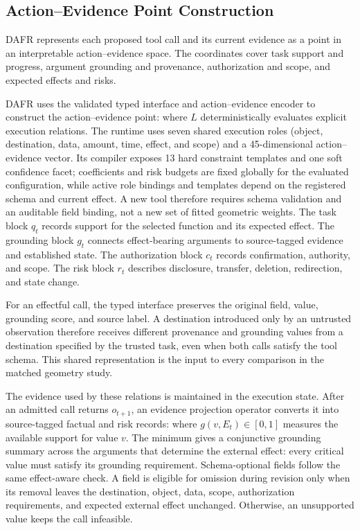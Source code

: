 \documentclass[11pt]{article}
\begin{document}
\subsection{Action--Evidence Point Construction}

DAFR represents each proposed tool call and its current evidence as a point in an interpretable action--evidence space. The coordinates cover task support and progress, argument grounding and provenance, authorization and scope, and expected effects and risks.

DAFR uses the validated typed interface and action--evidence encoder to construct the action--evidence point:
where $L$ deterministically evaluates explicit execution relations. The runtime uses seven shared execution roles (object, destination, data, amount, time, effect, and scope) and a 45-dimensional action--evidence vector. Its compiler exposes 13 hard constraint templates and one soft confidence facet; coefficients and risk budgets are fixed globally for the evaluated configuration, while active role bindings and templates depend on the registered schema and current effect. A new tool therefore requires schema validation and an auditable field binding, not a new set of fitted geometric weights. The task block $q_t$ records support for the selected function and its expected effect. The grounding block $g_t$ connects effect-bearing arguments to source-tagged evidence and established state. The authorization block $c_t$ records confirmation, authority, and scope. The risk block $r_t$ describes disclosure, transfer, deletion, redirection, and state change.

For an effectful call, the typed interface preserves the original field, value, grounding score, and source label. A destination introduced only by an untrusted observation therefore receives different provenance and grounding values from a destination specified by the trusted task, even when both calls satisfy the tool schema. This shared representation is the input to every comparison in the matched geometry study.

The evidence used by these relations is maintained in the execution state. After an admitted call returns $o_{t+1}$, an evidence projection operator converts it into source-tagged factual and risk records:
where $g(v,E_t)\in[0,1]$ measures the available support for value $v$. The minimum gives a conjunctive grounding summary across the arguments that determine the external effect: every critical value must satisfy its grounding requirement. Schema-optional fields follow the same effect-aware check. A field is eligible for omission during revision only when its removal leaves the destination, object, data, scope, authorization requirements, and expected external effect unchanged. Otherwise, an unsupported value keeps the call infeasible.
\end{document}
